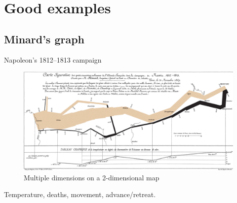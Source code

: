 \documentclass[12pt,english,pdf,dvipsnames,handout]{beamer}
\begin{document}
  

\section{Good examples}

\subsection{Minard's graph}
\begin{frame}{Napoleon's 1812--1813 campaign}

\begin{figure}
  \centering
  \includegraphics[scale=0.15]{../04-graphs/01_Minard_map}
  \caption{Multiple dimensions on a 2-dimensional map}
\end{figure}

Temperature, deaths, movement, advance/retreat.

\end{frame}
\end{document}
